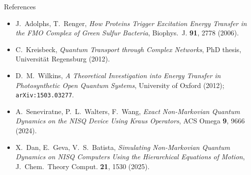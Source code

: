 \begin{frame}[t]{}
\begin{postercolumn}
  \begin{block}{References}
    \scriptsize
    \begin{itemize}\tightlist
      \item[{[1]}] J.~Adolphs, T.~Renger, \emph{How Proteins Trigger
            Excitation Energy Transfer in the FMO Complex of Green Sulfur
            Bacteria}, Biophys.~J. \textbf{91}, 2778 (2006).
      \item[{[2]}] C.~Kreisbeck, \emph{Quantum Transport through Complex
            Networks}, PhD thesis, Universit\"at Regensburg (2012).
      \item[{[3]}] D.~M.~Wilkins, \emph{A Theoretical Investigation into
            Energy Transfer in Photosynthetic Open Quantum Systems},
            University of Oxford (2012); \texttt{arXiv:1503.03277}.
      \item[{[4]}] A.~Seneviratne, P.~L.~Walters, F.~Wang, \emph{Exact
            Non-Markovian Quantum Dynamics on the NISQ Device Using Kraus
            Operators}, ACS Omega \textbf{9}, 9666 (2024).
      \item[{[5]}] X.~Dan, E.~Geva, V.~S.~Batista, \emph{Simulating
            Non-Markovian Quantum Dynamics on NISQ Computers Using the
            Hierarchical Equations of Motion}, J.~Chem.~Theory Comput.
            \textbf{21}, 1530 (2025).
    \end{itemize}
  \end{block}%
\end{postercolumn}
\end{frame}

